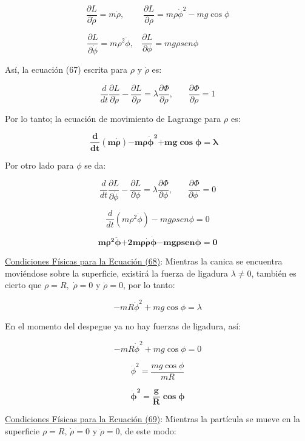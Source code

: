 \documentclass[]{article}
\begin{document}
\[\frac{\partial L}{\partial\dot{\rho}} = m\dot{\rho},\ \ \ \ \ \ \ \ \ \ \frac{\partial L}{\partial\rho} = m\rho{\dot{\phi}}^{2} - mg\cos\phi\]

\[\frac{\partial L}{\partial\dot{\phi}} = m\rho^{2}\dot{\phi},\ \ \ \ \frac{\partial L}{\partial\phi} = mg\rho{sen}\phi\ \ \ \ \ \ \ \ \ \ \ \ \ \ \ \ \]

Así, la ecuación (67) escrita para \(\rho\) y \(\dot{\rho}\) es:

\[\frac{d}{dt}\frac{\partial L}{\partial\dot{\rho}} - \frac{\partial L}{\partial\rho} = \lambda\frac{\partial\Phi}{\partial\rho},\ \ \ \ \ \ \ \ \frac{\partial\Phi}{\partial\rho} = 1\]

Por lo tanto; la ecuación de movimiento de Lagrange para \(\rho\) es:

\[\mathbf{\ }\frac{\mathbf{d}}{\mathbf{dt}}\left( \mathbf{m}\dot{\mathbf{\rho}} \right)\mathbf{- m\rho}{\dot{\mathbf{\phi}}}^{\mathbf{2}}\mathbf{+ mg}\mathbf{\cos}\mathbf{\phi}\mathbf{=}\mathbf{\lambda\ \ \ \ \ }\]

Por otro lado para \(\phi\) se da:

\[\frac{d}{dt}\frac{\partial L}{\partial\dot{\phi}} - \frac{\partial L}{\partial\phi} = \lambda\frac{\partial\Phi}{\partial\phi},\ \ \ \ \ \ \ \ \frac{\partial\Phi}{\partial\phi\ } = 0\]

\[\frac{d}{dt}\left( m\rho^{2}\dot{\phi} \right) - mg\rho{sen}\phi = 0\]

\[\mathbf{m}\mathbf{\rho}^{\mathbf{2}}\ddot{\mathbf{\phi}}\mathbf{+ 2}\mathbf{m\rho}\dot{\mathbf{\rho}}\dot{\mathbf{\phi}}\mathbf{- mg\rho}\mathbf{sen}\mathbf{\phi}\mathbf{= 0}\]

\uline{Condiciones Físicas para la Ecuación (68)}: Mientras la canica se
encuentra moviéndose sobre la superficie, existirá la fuerza de ligadura
\(\lambda \neq 0\), también es cierto que \(\rho = R,\)
\(\dot{\rho} = 0\) y \(\ddot{\rho} = 0\), por lo tanto:

\[- mR{\dot{\phi}}^{2} + mg\cos\phi = \lambda\]

En el momento del despegue ya no hay fuerzas de ligadura, así:

\[- mR{\dot{\phi}}^{2} + mg\cos\phi = 0\]

\[{\dot{\phi}}^{2} = \frac{mg\cos\phi}{mR}\]

\[{\dot{\mathbf{\phi}}}^{\mathbf{2}}\mathbf{=}\frac{\mathbf{g}}{\mathbf{R}}\mathbf{\cos}\mathbf{\phi}\]

\uline{Condiciones Físicas para la Ecuación (69)}: Mientras la partícula
se mueve en la superficie \(\rho = R\), \(\dot{\rho} = 0\) y
\(\ddot{\rho} = 0\), de este modo:
\end{document}
